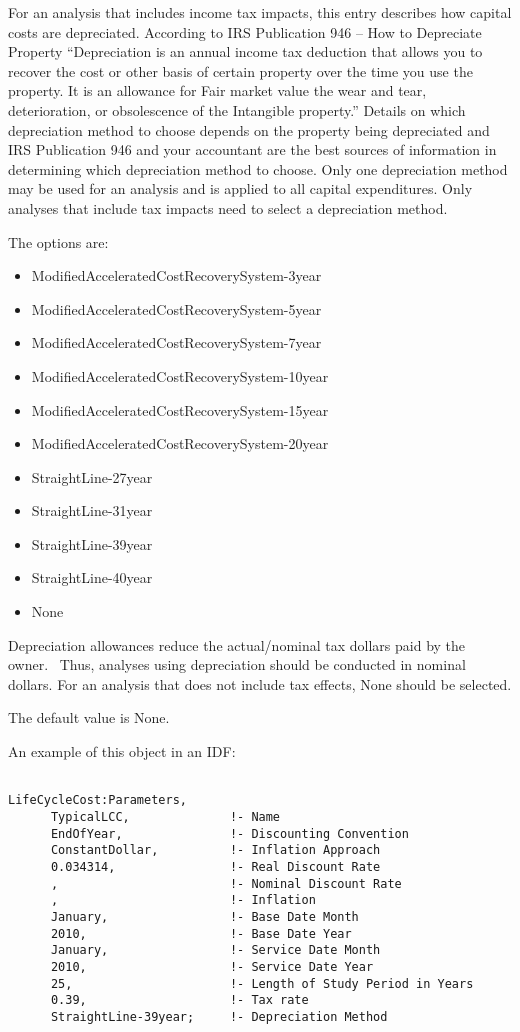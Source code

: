 For an analysis that includes income tax impacts, this entry describes how capital costs are depreciated. According to IRS Publication 946 -- How to Depreciate Property ``Depreciation is an annual income tax deduction that allows you to recover the cost or other basis of certain property over the time you use the property. It is an allowance for Fair market value the wear and tear, deterioration, or obsolescence of the Intangible property.'' Details on which depreciation method to choose depends on the property being depreciated and IRS Publication 946 and your accountant are the best sources of information in determining which depreciation method to choose. Only one depreciation method may be used for an analysis and is applied to all capital expenditures. Only analyses that include tax impacts need to select a depreciation method.

The options are:

\begin{itemize}
\item
  ModifiedAcceleratedCostRecoverySystem-3year
\item
  ModifiedAcceleratedCostRecoverySystem-5year
\item
  ModifiedAcceleratedCostRecoverySystem-7year
\item
  ModifiedAcceleratedCostRecoverySystem-10year
\item
  ModifiedAcceleratedCostRecoverySystem-15year
\item
  ModifiedAcceleratedCostRecoverySystem-20year
\item
  StraightLine-27year
\item
  StraightLine-31year
\item
  StraightLine-39year
\item
  StraightLine-40year
\item
  None
\end{itemize}

Depreciation allowances reduce the actual/nominal tax dollars paid by the owner.~ Thus, analyses using depreciation should be conducted in nominal dollars. For an analysis that does not include tax effects, None should be selected.

The default value is None.

An example of this object in an IDF:

\begin{lstlisting}

LifeCycleCost:Parameters,
      TypicalLCC,              !- Name
      EndOfYear,               !- Discounting Convention
      ConstantDollar,          !- Inflation Approach
      0.034314,                !- Real Discount Rate
      ,                        !- Nominal Discount Rate
      ,                        !- Inflation
      January,                 !- Base Date Month
      2010,                    !- Base Date Year
      January,                 !- Service Date Month
      2010,                    !- Service Date Year
      25,                      !- Length of Study Period in Years
      0.39,                    !- Tax rate
      StraightLine-39year;     !- Depreciation Method
\end{lstlisting}
